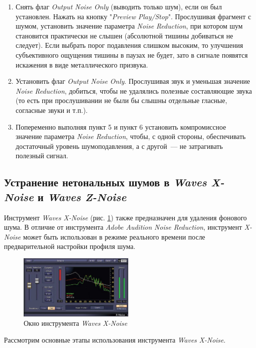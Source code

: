 \documentclass[oneside, final, 14pt]{extreport}
\begin{document}
\begin{enumerate}
    \item Снять флаг \textit{Output Noise Only} (выводить только шум), если он был установлен. Нажать на кнопку "\textit{Preview Play/Stop}". Прослушивая фрагмент с шумом, установить значение параметра \textit{Noise Reduction}, при котором шум становится практически не слышен (абсолютной тишины добиваться не следует). Если выбрать порог подавления слишком высоким, то улучшения субъективного ощущения тишины в паузах не будет, зато в сигнале появятся искажения в виде металлического призвука.
    \item Установить флаг \textit{Output Noise Only}. Прослушивая звук и уменьшая значение \textit{Noise Reduction}, добиться, чтобы не удалялись полезные составляющие звука (то есть при прослушивании не были бы слышны отдельные гласные, согласные звуки и т.п.).
    \item Попеременно выполняя пункт 5 и пункт 6 установить компромиссное значение параметра \textit{Noise Reduction}, чтобы, с одной стороны, обеспечивать достаточный уровень шумоподавления, а с другой~--– не затрагивать полезный сигнал.
\end{enumerate}

\subsection{Устранение нетональных шумов в \emph{Waves X-Noise} и \emph{Waves Z-Noise}}
Инструмент \emph{Waves X-Noise} (рис. \ref{pic-xnoise-01}) также предназначен для удаления фонового шума. В отличие от инструмента \textit{Adobe Audition Noise Reduction}, инструмент \emph{X-Noise} может быть использован в режиме реального времени после предварительной настройки профиля шума.

\begin{figure}[h]
    \centering
    \includegraphics[width=0.5\textwidth]{pic-xnoise-01}
    \caption{Окно инструмента \textit{Waves X-Noise}}
    \label{pic-xnoise-01}
\end{figure}

Рассмотрим основные этапы использования инструмента \emph{Waves X-Noise}.
\end{document}
